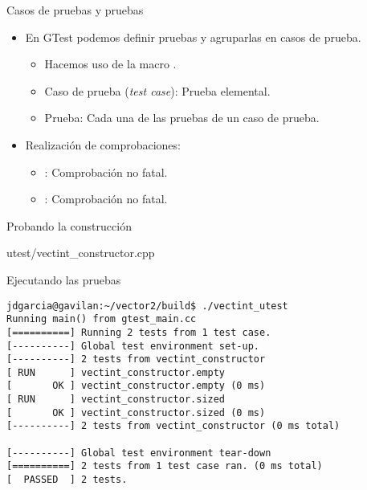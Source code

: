 \begin{frame}[t]{Casos de pruebas y pruebas}
\begin{itemize}
  \item En GTest podemos definir pruebas y agruparlas en casos de prueba.
    \begin{itemize}
      \item Hacemos uso de la macro .
      \item Caso de prueba (\emph{test case}): Prueba elemental.
      \item Prueba: Cada una de las pruebas de un caso de prueba.
    \end{itemize}

  \vfill
  \item Realización de comprobaciones:
    \begin{itemize}
      \item {}: Comprobación no fatal.
      \item {}: Comprobación no fatal.
    \end{itemize}
\end{itemize}
\end{frame}

\begin{frame}[t]{Probando la construcción}
\begin{block}{utest/vectint\_constructor.cpp}

\end{block}
\end{frame}

\begin{frame}[t,fragile]{Ejecutando las pruebas}
\begin{lstlisting}[style=terminal]
jdgarcia@gavilan:~/vector2/build$ ./vectint_utest 
Running main() from gtest_main.cc
[==========] Running 2 tests from 1 test case.
[----------] Global test environment set-up.
[----------] 2 tests from vectint_constructor
[ RUN      ] vectint_constructor.empty
[       OK ] vectint_constructor.empty (0 ms)
[ RUN      ] vectint_constructor.sized
[       OK ] vectint_constructor.sized (0 ms)
[----------] 2 tests from vectint_constructor (0 ms total)

[----------] Global test environment tear-down
[==========] 2 tests from 1 test case ran. (0 ms total)
[  PASSED  ] 2 tests.
\end{lstlisting}
\end{frame}

